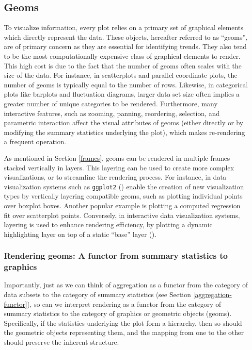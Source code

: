 \documentclass[
  openany]{book}
\theoremstyle{definition}
\theoremstyle{definition}
\theoremstyle{definition}
\theoremstyle{definition}
\theoremstyle{remark}
\begin{document}
\subsection{Geoms}\label{geoms}

To visualize information, every plot relies on a primary set of graphical elements which directly represent the data. These objects, hereafter referred to as ``geoms'', are of primary concern as they are essential for identifying trends. They also tend to be the most computationally expensive class of graphical elements to render. This high cost is due to the fact that the number of geoms often scales with the size of the data. For instance, in scatterplots and parallel coordinate plots, the number of geoms is typically equal to the number of rows. Likewise, in categorical plots like barplots and fluctuation diagrams, larger data set size often implies a greater number of unique categories to be rendered. Furthermore, many interactive features, such as zooming, panning, reordering, selection, and parametric interaction affect the visual attributes of geoms (either directly or by modifying the summary statistics underlying the plot), which makes re-rendering a frequent operation.

As mentioned in Section \ref{frames}, geoms can be rendered in multiple frames stacked vertically in layers. This layering can be used to create more complex visualizations, or to streamline the rendering process. For instance, in data visualization systems such as \texttt{ggplot2} () enable the creation of new visualization types by vertically layering compatible geoms, such as plotting individual points over boxplot boxes. Another popular example is plotting a computed regression fit over scatterplot points. Conversely, in interactive data visualization systems, layering is used to enhance rendering efficiency, by plotting a dynamic highlighting layer on top of a static ``base'' layer ().

\subsubsection{Rendering geoms: A functor from summary statistics to graphics}\label{rendering-functor}

Importantly, just as we can think of aggregation as a functor from the category of data subsets to the category of summary statistics (see Section \ref{aggregation-functor}), so can we interpret rendering as a functor from the category of summary statistics to the category of graphics or geometric objects (geoms). Specifically, if the statistics underlying the plot form a hierarchy, then so should the geometric objects representing them, and the mapping from one to the other should preserve the inherent structure.
\end{document}
